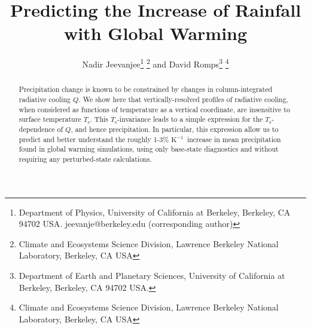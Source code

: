 \documentclass[10pt]{article}
\newcommand{\Ts}{\ensuremath{T_\mathrm{s}}}
\newcommand{\Kinverse}{\ensuremath{\mathrm{K^{-1}}}}
\begin{document}
%
%


\title{Predicting the Increase of Rainfall with Global Warming}

%
%


 \author{Nadir Jeevanjee\footnote{Department of Physics, University of California at Berkeley, Berkeley, CA 94702  USA. jeevanje@berkeley.edu (corresponding author)} \footnote{Climate and Ecosystems Science Division, Lawrence Berkeley National Laboratory, Berkeley, CA USA} and David Romps\footnote{Department of Earth and Planetary Sciences, University of California at Berkeley, Berkeley, CA 94702  USA.} \footnote{Climate and Ecosystems Science Division, Lawrence Berkeley National Laboratory, Berkeley, CA USA}
}

\maketitle

\begin{abstract}
Precipitation change is known to be constrained by changes in column-integrated radiative cooling $Q$. We show here that vertically-resolved profiles of radiative cooling, when considered as functions of temperature as a vertical coordinate, are insensitive to surface temperature \Ts. This \Ts-invariance leads to a simple expression for the \Ts-dependence of $Q$, and hence precipitation. In particular, this expression allow us to predict and better understand the roughly 1-3\% \Kinverse\ increase in mean precipitation  found in global warming simulations, using only base-state diagnostics and without requiring any perturbed-state calculations.

%
%
\end{abstract}


%
%
\end{document}
